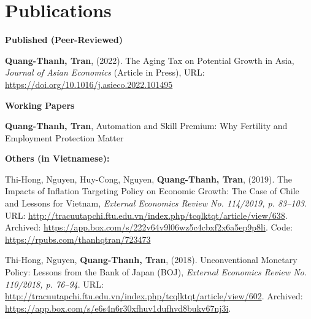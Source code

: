 \section{\sc Publications}
{\bf Published (Peer-Reviewed)}
\vspace*{.05in}
\begin{etaremune}[]
\item
  {\bf Quang-Thanh, Tran},
  (2022).
  {The Aging Tax on Potential Growth in Asia},
  {\it Journal of Asian Economics} (Article in Press),
  {URL: \url{https://doi.org/10.1016/j.asieco.2022.101495}}
\end{etaremune}

\vspace{4mm}

{\bf Working Papers}
\vspace*{.05in}
\begin{etaremune}[]
\item
  {\bf Quang-Thanh, Tran},
  {Automation and Skill Premium: Why Fertility and Employment Protection Matter}
\end{etaremune}

\vspace{4mm}


{\bf Others (in Vietnamese):}
\vspace*{.05in}
\begin{etaremune}[]
	\item
	Thi-Hong, Nguyen,
	Huy-Cong, Nguyen,
	{\bf Quang-Thanh, Tran},
	(2019).
	{The Impacts of Inflation Targeting Policy on Economic Growth: The Case of Chile and Lessons for Vietnam},
	{\it External Economics Review No. 114/2019, p. 83--103}.
	{URL: \url{http://tracuutapchi.ftu.edu.vn/index.php/tcqlktqt/article/view/638}}.
	{Archived: \url{https://app.box.com/s/222v64v9l06wz5c4cbxf2x6a5ep9p8li}. Code: \url{https://rpubs.com/thanhqtran/723473}}

	\item 
	Thi-Hong, Nguyen,
	{\bf Quang-Thanh, Tran},
	(2018).
	Unconventional Monetary Policy: Lessons from the Bank of Japan (BOJ),
	{\it External Economics Review No. 110/2018, p. 76--94}.
	{URL: \url{http://tracuutapchi.ftu.edu.vn/index.php/tcqlktqt/article/view/602}}. 
	{Archived: \url{https://app.box.com/s/e6s4n6r30xfhuv1dufhvd8bukv67nj3i}}.
\end{etaremune}


